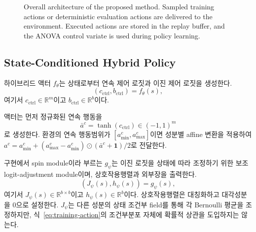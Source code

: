 \documentclass[10pt,journal]{IEEEtran}
\newcommand{\R}{\mathbb{R}}
\begin{document}
\begin{figure}[t]
{
}
\caption{
Overall architecture of the proposed method.
Sampled training actions or deterministic evaluation actions are delivered
to the environment. Executed actions are stored in the replay buffer, and
the ANOVA control variate is used during policy learning.
}
\label{fig:overall-architecture}
\end{figure}


\subsection{State-Conditioned Hybrid Policy}

하이브리드 액터 $f_\theta$는 상태로부터 연속 제어 로짓과 이진 제어 로짓을 생성한다.
\begin{equation}
(c_{\mathrm{ctrl}},b_{\mathrm{ctrl}})
=
f_\theta(s),
\label{eq:actor-output}
\end{equation}
여기서
$c_{\mathrm{ctrl}}\in\R^m$이고
$b_{\mathrm{ctrl}}\in\R^b$이다.

액터는 먼저 정규화된 연속 행동을
\begin{equation}
\bar a^c=\tanh(c_{\mathrm{ctrl}})\in(-1,1)^m
\label{eq:continuous-action}
\end{equation}
로 생성한다. 환경의 연속 행동범위가
$[a_{\min}^c,a_{\max}^c]$이면 성분별 affine 변환을 적용하여
$a^c=a_{\min}^c+(a_{\max}^c-a_{\min}^c)\odot(\bar a^c+\mathbf1)/2$로 전달한다.

구현에서 spin module이라 부르는 $g_\psi$는 이진 로짓을 상태에 따라 조정하기 위한 보조 logit-adjustment module이며, 상호작용행렬과 외부장을 출력한다.
\begin{equation}
(J_\psi(s),h_\psi(s))
=
g_\psi(s),
\label{eq:spin-module}
\end{equation}
여기서
$J_\psi(s)\in\R^{b\times b}$이고
$h_\psi(s)\in\R^b$이다. 상호작용행렬은 대칭화하고 대각성분을 0으로 설정한다. $J_\psi$는 다른 성분의 상태 조건부 field를 통해 각 Bernoulli 평균을 조정하지만, 식~\eqref{eq:training-action}의 조건부분포 자체에 확률적 상관을 도입하지는 않는다.
\end{document}
